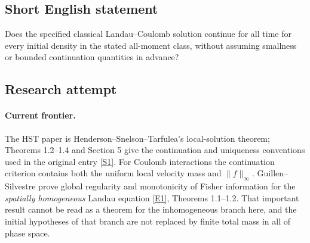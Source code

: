 \documentclass[11pt,a4paper]{article}
\newcommand{\sref}[2]{\hyperlink{source:#1:#2}{[S#2]}}
\newcommand{\eref}[2]{\hyperlink{extra:#1:#2}{[E#2]}}
\newif\ifshowcatalogue
\newcommand{\cataloguescope}[1]{\ifshowcatalogue
 \paragraph{Exact scope in the supplied catalogue.}
 \begin{quote}\small #1\end{quote}\fi}
\numberwithin{equation}{section}
\begin{document}
\cataloguescope{Fix a positive physical constant a. On [0,infinity) times R\textasciicircum{}3\_x times R\textasciicircum{}3\_v consider the classical Landau equation (partial\_t+v dot grad\_x)f=Q(f,f), where Q(f,f)=div\_v integral\_\{R\textasciicircum{}3\} A(v-w)[f(t,x,w) grad\_v f(t,x,v)-f(t,x,v) grad\_w f(t,x,w)]dw and A(z)=a |z|\textasciicircum{}(-1)(I-z tensor z/|z|\textasciicircum{}2) for z!=0. For every nonnegative initial datum f\_0 on R\textasciicircum{}6 with f\_0 in the global Holder space C\textasciicircum{}alpha for some 0<alpha<1, sup\_\{x,v\}<v>\textasciicircum{}k f\_0(x,v)<infinity for every k>=0, and constants delta,r\_0,R>0 such that for every x there exists |v\_x|<R with f\_0>=delta on the Euclidean R\textasciicircum{}6 ball B\_\{r\_0\}(x,v\_x), does the classical solution branch constructed in HST Theorems 1.2–1.4 have maximal continuation time T\_E=infinity? Here <v>=(1+|v|\textasciicircum{}2)\textasciicircum{}(1/2); the branch matches f\_0 as t decreases to zero, is smooth for positive time, and has all polynomial velocity weights bounded on every finite time slab of its existence. The exact question is global extension of that branch, with the sufficiently decaying uniformly continuous kinetic weak uniqueness convention in HST Section 5, not uniqueness among all generalized weak solutions. The HST Coulomb continuation quantity is Psi(T)=esssup\_\{0<=t<=T,x\} integral f(t,x,v)dv + esssup\_\{0<=t<=T,x,v\} f(t,x,v). Finite Psi on every finite time slab is the associated continuation criterion, not an extra hypothesis presumed true. No smallness near equilibrium, finite total spatial mass or uniform bound across different initial data is imposed.}
\subsection{Short English statement}
Does the specified classical Landau–Coulomb solution continue for all time for every initial density in the stated all-moment class, without assuming smallness or bounded continuation quantities in advance?
\subsection{Research attempt}

\paragraph{Current frontier.}
The HST paper is Henderson--Snelson--Tarfulea's local-solution theorem;
Theorems 1.2--1.4 and Section 5 give the continuation and uniqueness
conventions used in the original entry \sref{statement}{1}. For Coulomb
interactions the continuation criterion contains both the uniform local
velocity mass and $\|f\|_\infty$. Guillen--Silvestre prove global regularity
and monotonicity of Fisher information for the \emph{spatially homogeneous}
Landau equation \eref{statement}{1}, Theorems 1.1--1.2. That important result
cannot be read as a theorem for the inhomogeneous branch here, and the
initial hypotheses of that branch are not replaced by finite total mass
in all of phase space.
\end{document}
